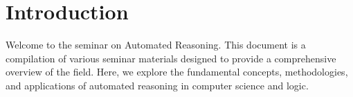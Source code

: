 \section{Introduction}
\label{sec:introduction}

Welcome to the seminar on Automated Reasoning. This document is a compilation of various seminar materials designed to provide a comprehensive overview of the field. Here, we explore the fundamental concepts, methodologies, and applications of automated reasoning in computer science and logic.

